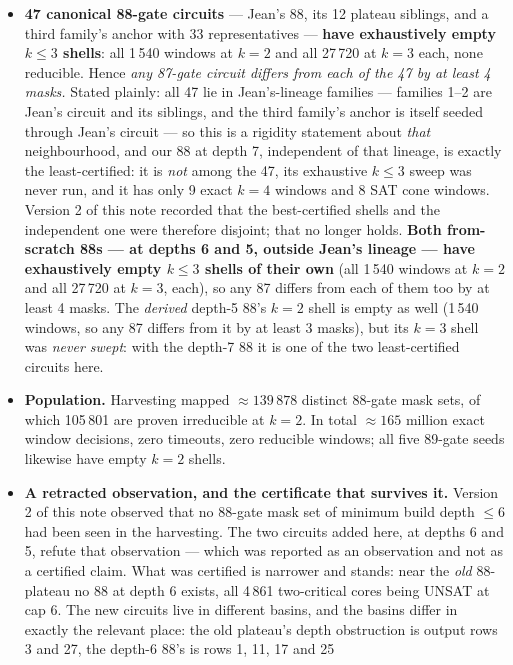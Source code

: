 \documentclass[11pt,a4paper]{article}
\begin{document}
\begin{itemize}
\item \textbf{47 canonical 88-gate circuits} --- Jean's 88, its 12 plateau
  siblings, and a third family's anchor with 33 representatives --- \textbf{have
  exhaustively empty $k \le 3$ shells}: all 1\,540 windows at $k=2$ and all
  27\,720 at $k=3$ each, none reducible. Hence \emph{any 87-gate circuit differs
  from each of the 47 by at least 4 masks.} Stated plainly: all 47 lie in
  Jean's-lineage families --- families 1--2 are Jean's circuit and its siblings,
  and the third family's anchor is itself seeded through Jean's circuit --- so
  this is a rigidity statement about \emph{that} neighbourhood, and our 88 at
  depth 7, independent of that lineage, is exactly the least-certified: it is
  \emph{not} among the 47, its exhaustive $k \le 3$ sweep was never run, and it
  has only 9 exact $k=4$ windows and 8 SAT cone windows. Version 2 of this note
  recorded that the best-certified shells and the independent one were therefore
  disjoint; that no longer holds. \textbf{Both from-scratch 88s --- at depths 6
  and 5, outside Jean's lineage --- have exhaustively empty $k \le 3$ shells of
  their own} (all 1\,540 windows at $k=2$ and all 27\,720 at $k=3$, each), so any
  87 differs from each of them too by at least 4 masks. The \emph{derived}
  depth-5 88's $k=2$ shell is empty as well
  (1\,540 windows, so any 87 differs from it by at least 3 masks), but its $k=3$
  shell was \emph{never swept}: with the depth-7 88 it is one of the two
  least-certified circuits here.
\item \textbf{Population.} Harvesting mapped $\approx 139\,878$
  distinct 88-gate mask sets, of which 105\,801 are proven irreducible at
  $k=2$. In total $\approx 165$ million
  exact window decisions, zero timeouts, zero reducible windows; all five
  89-gate seeds likewise have empty $k=2$ shells.
\item \textbf{A retracted observation, and the certificate that survives it.}
  Version 2 of this note observed that no 88-gate mask set of minimum build depth
  $\le 6$ had been seen in the harvesting. The two circuits added here, at depths
  6 and 5, refute that observation --- which was reported as an observation and
  not as a certified claim. What was certified is narrower and stands: near the
  \emph{old} 88-plateau no 88 at depth 6 exists, all 4\,861 two-critical cores
  being UNSAT at cap 6. The new circuits live in different basins, and the
  basins differ in exactly the relevant place: the old plateau's depth
  obstruction is output rows 3 and 27, the depth-6 88's is rows 1, 11, 17 and 25

\end{itemize}
\end{document}

